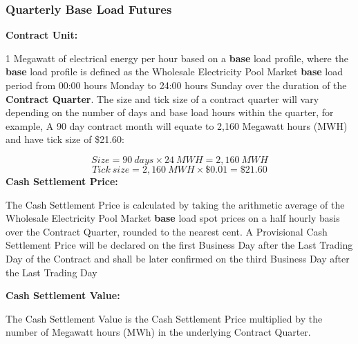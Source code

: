 \documentclass[12pt]{article}
\begin{document}
\subsubsection{Quarterly Base Load Futures}
\begin{flushleft}
\textbf{Contract Unit:}\par
1 Megawatt of electrical energy per hour based on a \textbf{base} load profile, where the \textbf{base} load profile is defined as the Wholesale Electricity Pool Market \textbf{base} load period from 00:00 hours Monday to 24:00 hours Sunday over the duration of the \textbf{Contract Quarter}. The size and tick size of a contract quarter will vary depending on the number of days and base load hours within the quarter, for example, 
A 90 day contract month will equate to 2,160 Megawatt hours (MWH) and have tick size of \$21.60:\par
   $$ Size = 90 \ days \times 24 \ MWH = 2,160 \ MWH $$
   $$ Tick\ size = 2,160 \ MWH \times \$0.01 = \$21.60 $$
\frameboxend
\textbf{Cash Settlement Price:}\par
The Cash Settlement Price is calculated by taking the arithmetic
average of the Wholesale Electricity Pool Market \textbf{base} load spot prices on a half hourly basis over the Contract Quarter, rounded to the nearest cent. A Provisional Cash Settlement Price will be declared on the first Business Day after the Last Trading Day of the Contract and shall be later confirmed on the third Business Day after the Last Trading Day\par
\textbf{Cash Settlement Value:}\par
The Cash Settlement Value is the Cash Settlement Price multiplied by the number of Megawatt hours (MWh) in the underlying Contract
Quarter.
\end{flushleft}
\end{document}
